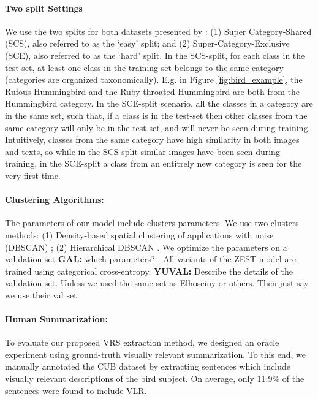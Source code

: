 \documentclass[11pt,a4paper]{article}
\newcommand\gal[1]{\textcolor{bright}{\textbf{GAL:} #1 }}
\newcommand\yuval[1]{\textcolor{darkpink}{\textbf{YUVAL:} #1 }}
\begin{document}
\paragraph{Two split Settings} We use the two splits for both datasets presented by \citet{elhoseiny2017link}: (1) Super Category-Shared (SCS), also referred to as the \enquote*{easy} split; and (2) Super-Category-Exclusive (SCE), also referred to as the \enquote*{hard} split. In the SCS-split, for each class in the test-set, at least one class in the training set belongs to the same category (categories are organized taxonomically). E.g. in Figure \ref{fig:bird_example}, the Rufous Hummingbird and the Ruby-throated Hummingbird are both from the Hummingbird category. In the SCE-split scenario, all the classes in a category are in the same set, such that, if a class is in the test-set then other classes from the same category will only be in the test-set, and will never be seen during training. Intuitively, classes from the same category have high similarity in both images and texts, so while in the SCS-split similar images have been seen during training, in the SCE-split a class from an entitrely new category is seen for the very first time. %

\paragraph{Clustering Algorithms:}
The parameters of our model include clusters parameters.
We use two clusters methods: (1) Density-based spatial clustering of applications with noise (DBSCAN) \citep{ester1996density}; (2) Hierarchical DBSCAN \citep{mcinnes2017hdbscan}.
We optimize the parameters on a validation set \gal{which parameters?}. All variants of the ZEST model are trained using categorical cross-entropy. \yuval{Describe the details of the validation set. Unless we used the same set as Elhoseiny or others. Then just say we use their val set.}

\paragraph{Human Summarization:} 
To evaluate our proposed VRS extraction method, we designed an oracle experiment using ground-truth visually relevant summarization. To this end, we manually annotated the CUB dataset by extracting sentences which include visually relevant descriptions of the bird subject. On average, only 11.9\% of the sentences were found to include VLR.  
\end{document}
